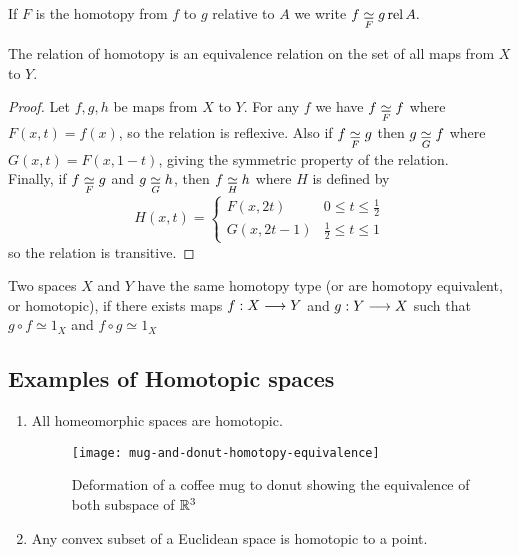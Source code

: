 \begin{notn}
    If $F$ is the homotopy from $f$ to $g$ relative to $A$ we write $\displaystyle f \underset{F}{\simeq} g \operatorname{rel} A.$
\end{notn}

\begin{lem}
    The relation of homotopy is an equivalence relation on the set of all maps from $X$ to $Y$.
\end{lem}
\begin{proof}
    Let $f,g,h$ be maps from $X$ to $Y$. For any $f$ we have $f \underset{F}{\simeq} f$ where $F(x,t) = f(x)$, so the relation is reflexive. Also if $f \underset{F}{\simeq} g$ then $g \underset{G}{\simeq} f$ where $G(x,t) = F(x, 1-t)$, giving the symmetric property of the relation.
    \\
    Finally, if $f \underset{F}{\simeq} g$ and $g \underset{G}{\simeq} h$, then $f \underset{H}{\simeq} h$ where $H$ is defined by
    \begin{equation*}
        H(x,t) = \begin{cases}
            F(x, 2t) & 0 \le t \le \frac12 \\
            G(x, 2t - 1) & \frac12 \le t \le 1
        \end{cases}
    \end{equation*}
    so the relation is transitive.
\end{proof}



\begin{defn}
Two spaces $X$ and $Y$ have the same homotopy type (or are homotopy equivalent, or homotopic), if there exists maps $f: X \longrightarrow Y$ and $g : Y \longrightarrow X$ such that $g \circ f \simeq 1_X$ and $f \circ g \simeq 1_X$
\end{defn}


\begin{center}
\end{center}


\subsection*{Examples of Homotopic spaces}
\begin{enumerate}
\item All homeomorphic spaces are homotopic.
\begin{figure}[H]
    \centering
    \texttt{[image: mug-and-donut-homotopy-equivalence]}
    \caption{Deformation of a coffee mug to donut showing the equivalence of both subspace of $\mathbb{R}^3$}
\end{figure}
\item Any convex subset of a Euclidean space is homotopic to a point.
\end{enumerate}


